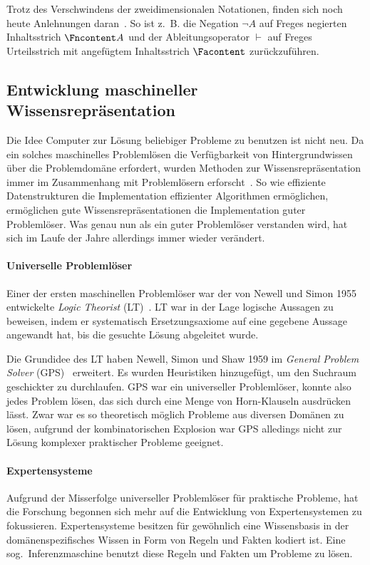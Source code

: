 Trotz des Verschwindens der zweidimensionalen Notationen, finden sich noch heute Anlehnungen daran~\cite{WikiBegriffsschrift}.
So ist z.~B. die Negation $\lnot A$ auf Freges negierten Inhaltsstrich $\Fncontent A$ und der Ableitungsoperator $\vdash$ auf Freges Urteilsstrich mit angefügtem Inhaltsstrich $\Facontent$ zurückzuführen.

\subsection{Entwicklung maschineller Wissensrepräsentation}%
\label{sec:related:kr:history}

Die Idee Computer zur Lösung beliebiger Probleme zu benutzen ist nicht neu.
Da ein solches maschinelles Problemlösen die Verfügbarkeit von Hintergrundwissen über die Problemdomäne erfordert,
wurden Methoden zur Wissensrepräsentation immer im Zusammenhang mit Problemlösern erforscht~\cite{Hayes-Roth1983}.
So wie effiziente Datenstrukturen die Implementation effizienter Algorithmen ermöglichen, ermöglichen gute Wissensrepräsentationen die Implementation guter Problemlöser.
Was genau nun als ein guter Problemlöser verstanden wird, hat sich im Laufe der Jahre allerdings immer wieder verändert.

\paragraph{Universelle Problemlöser}
Einer der ersten maschinellen Problemlöser war der von Newell und Simon 1955 entwickelte \textit{Logic Theorist} (LT)~\cite{Newell1956}.
LT war in der Lage logische Aussagen zu beweisen, indem er systematisch Ersetzungsaxiome auf eine gegebene Aussage angewandt hat, bis die gesuchte Lösung abgeleitet wurde.

Die Grundidee des LT haben Newell, Simon und Shaw 1959 im \textit{General Problem Solver} (GPS)~\cite{Newell1959} erweitert.
Es wurden Heuristiken hinzugefügt, um den Suchraum geschickter zu durchlaufen.
GPS war ein universeller Problemlöser, konnte also jedes Problem lösen, das sich durch eine Menge von Horn-Klauseln ausdrücken lässt.
Zwar war es so theoretisch möglich Probleme aus diversen Domänen zu lösen, aufgrund der kombinatorischen Explosion war GPS alledings nicht zur Lösung komplexer praktischer Probleme geeignet.

\paragraph{Expertensysteme}
Aufgrund der Misserfolge universeller Problemlöser für praktische Probleme, hat die Forschung begonnen sich mehr auf die Entwicklung von Expertensystemen zu fokussieren.
Expertensysteme besitzen für gewöhnlich eine Wissensbasis in der domänenspezifisches Wissen in Form von Regeln und Fakten kodiert ist.
Eine sog.~Inferenzmaschine benutzt diese Regeln und Fakten um Probleme zu lösen.

